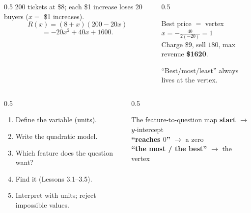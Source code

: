 \documentclass[aspectratio=169, 11pt]{beamer}
\begin{document}
\begin{frame}[t, plain]
  \begin{columns}[T]
    \begin{column}{0.5\textwidth}
      $200$ tickets at \$8; each \$1 increase loses $20$ buyers ($x=$ \$1 increases).
      \[ R(x)=(8+x)(200-20x) \]
      \[ =-20x^2+40x+1600. \]
    \end{column}
    \begin{column}{0.5\textwidth}
      \begin{block}{Best price $=$ vertex}
        $x=-\tfrac{40}{2(-20)}=1$ \\[2pt]
        Charge \$9, sell $180$, max revenue \textbf{\$1620}.
      \end{block}
      \small ``Best/most/least'' always lives at the vertex.
    \end{column}
  \end{columns}
\end{frame}

\begin{frame}[t, plain]
  \begin{columns}[T]
    \begin{column}{0.5\textwidth}
      \begin{enumerate}\setlength{\itemsep}{3pt}
        \item Define the variable (units).
        \item Write the quadratic model.
        \item Which feature does the question want?
        \item Find it (Lessons 3.1--3.5).
        \item Interpret with units; reject impossible values.
      \end{enumerate}
    \end{column}
    \begin{column}{0.5\textwidth}
      \begin{block}{The feature-to-question map}
        \textbf{start} $\to$ $y$-intercept \\
        \textbf{``reaches $0$''} $\to$ a zero \\
        \textbf{``the most / the best''} $\to$ the vertex
      \end{block}
    \end{column}
  \end{columns}
\end{frame}
\end{document}

